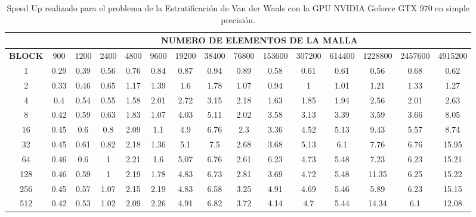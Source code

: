 \begin{table}[]
    \begin{tabular}{|c|c|c|c|c|c|c|c|c|c|c|c|c|c|c|}
    \hline
                   & \multicolumn{14}{c|}{\textbf{NUMERO DE ELEMENTOS DE LA MALLA}}                                                    \\ \hline
    \textbf{BLOCK} & 900  & 1200 & 2400 & 4800 & 9600 & 19200 & 38400 & 76800 & 153600 & 307200 & 614400 & 1228800 & 2457600 & 4915200 \\ \hline
    1              & 0.29 & 0.39 & 0.56 & 0.76 & 0.84 & 0.87  & 0.94  & 0.89  & 0.58   & 0.61   & 0.61   & 0.56    & 0.68    & 0.62    \\ \hline
    2              & 0.33 & 0.46 & 0.65 & 1.17 & 1.39 & 1.6   & 1.78  & 1.07  & 0.94   & 1      & 1.01   & 1.21    & 1.33    & 1.27    \\ \hline
    4              & 0.4  & 0.54 & 0.55 & 1.58 & 2.01 & 2.72  & 3.15  & 2.18  & 1.63   & 1.85   & 1.94   & 2.56    & 2.01    & 2.63    \\ \hline
    8              & 0.42 & 0.59 & 0.63 & 1.83 & 1.07 & 4.03  & 5.11  & 2.02  & 3.58   & 3.13   & 3.39   & 3.59    & 3.66    & 8.05    \\ \hline
    16             & 0.45 & 0.6  & 0.8  & 2.09 & 1.1  & 4.9   & 6.76  & 2.3   & 3.36   & 4.52   & 5.13   & 9.43    & 5.57    & 8.74    \\ \hline
    32             & 0.45 & 0.61 & 0.82 & 2.18 & 1.36 & 5.1   & 7.5   & 2.68  & 3.68   & 5.13   & 6.1    & 7.76    & 6.76    & 15.95   \\ \hline
    64             & 0.46 & 0.6  & 1    & 2.21 & 1.6  & 5.07  & 6.76  & 2.61  & 6.23   & 4.73   & 5.48   & 7.23    & 6.23    & 15.21   \\ \hline
    128            & 0.46 & 0.59 & 1    & 2.19 & 1.78 & 4.83  & 6.73  & 2.81  & 3.69   & 4.72   & 5.48   & 11.35   & 6.25    & 15.22   \\ \hline
    256            & 0.45 & 0.57 & 1.07 & 2.15 & 2.19 & 4.83  & 6.58  & 3.25  & 4.91   & 4.69   & 5.46   & 5.89    & 6.23    & 15.15   \\ \hline
    512            & 0.42 & 0.53 & 1.02 & 2.09 & 2.26 & 4.91  & 6.82  & 3.72  & 4.14   & 4.7    & 5.44   & 14.34   & 6.1     & 12.08   \\ \hline    \end{tabular}
    \caption{Speed Up realizado para el problema de la Estratificación de Van der Waals con la GPU NVIDIA Geforce GTX 970 en simple precisión.}
    \label{tab:s_970_VdW_simple_10}
    \end{table}